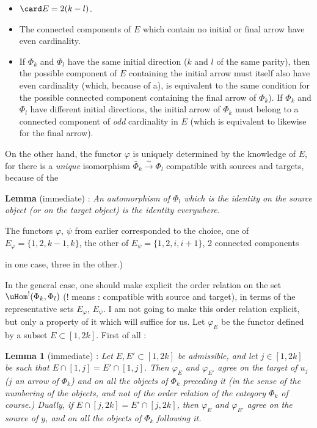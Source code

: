 \begin{itemize}
\item[a)] $\card E=2(k-l)$.
\item[b)] The connected components of $E$ which contain no initial or final arrow have even cardinality.
\item[c)] If $\Phi_k$ and $\Phi_l$ have the same initial direction ($k$ and $l$ of the same parity), then the possible component of $E$ containing the initial arrow must itself also have even cardinality (which, because of a), is equivalent to the same condition for the possible connected component containing the final arrow of $\Phi_k$). If $\Phi_k$ and $\Phi_l$ have different initial directions, the initial arrow of $\Phi_k$ must belong to a connected component of \textit{odd} cardinality in $E$ (which is equivalent to likewise for the final arrow).
\end{itemize}

On the other hand, the functor $\varphi$ is uniquely determined by the knowledge of $E$, for there is a \textit{unique} isomorphism $\bar{\Phi}_k\xrightarrow{\sim}\Phi_l$ compatible with sources and targets, because of the

\textbf{Lemma} (immediate) : \textit{An automorphism of $\Phi_l$ which is the identity on the source object (or on the target object) is the identity everywhere.}

The functors $\varphi$, $\psi$ from earlier corresponded to the choice, one of $E_\varphi=\{1,2,k-1,k\}$, the other of $E_\psi=\{1,2,i,i+1\}$, 2 connected components

in one case, three in the other.) %



In the general case, one should make explicit the order relation on the set $\uHom^{!}(\Phi_k,\Phi_l)$ (! means : compatible with source and target), in terms of the representative sets $E_\varphi$, $E_\psi$. I am not going to make this order relation explicit, but only a property of it which will suffice for us. Let $\varphi_E$ be the functor defined by a subset $E\subset[1,2k]$. First of all :

\textbf{Lemma 1} (immediate) : \textit{Let $E,E'\subset[1,2k]$ be admissible, and let $j\in[1,2k]$ be such that $E\cap[1,j]=E'\cap[1,j]$. Then $\varphi_E$ and $\varphi_{E'}$ agree on the target of $u_j$ ($j$ an arrow of $\Phi_k$) and on all the objects of $\Phi_k$ preceding it (in the sense of the numbering of the objects, and not of the order relation of the category $\Phi_k$ of course.) Dually, if $E\cap[j,2k]=E'\cap[j,2k]$, then $\varphi_E$ and $\varphi_{E'}$ agree on the source of $y$, and on all the objects of $\Phi_k$ following it.} %

